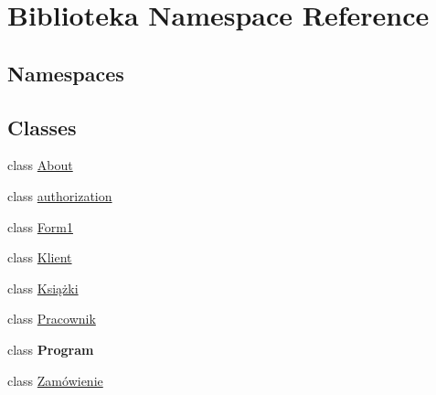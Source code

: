 \hypertarget{namespace_biblioteka}{}\section{Biblioteka Namespace Reference}
\label{namespace_biblioteka}
\subsection*{Namespaces}
\begin{DoxyCompactItemize}
\end{DoxyCompactItemize}
\subsection*{Classes}
\begin{DoxyCompactItemize}
\item 
class \hyperlink{class_biblioteka_1_1_about}{About}
\item 
class \hyperlink{class_biblioteka_1_1authorization}{authorization}
\item 
class \hyperlink{class_biblioteka_1_1_form1}{Form1}
\item 
class \hyperlink{class_biblioteka_1_1_klient}{Klient}
\item 
class \hyperlink{class_biblioteka_1_1_ksi_xC4_x85_xC5_xBCki}{Książki}
\item 
class \hyperlink{class_biblioteka_1_1_pracownik}{Pracownik}
\item 
class {\bfseries Program}
\item 
class \hyperlink{class_biblioteka_1_1_zam_xC3_xB3wienie}{Zamówienie}
\end{DoxyCompactItemize}
